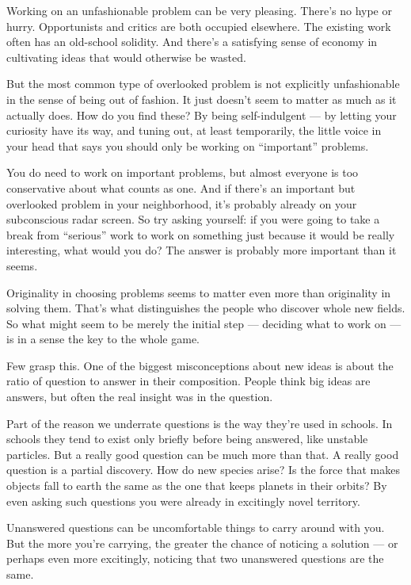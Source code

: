 \documentclass[12pt]{book}
\begin{document}
Working on an unfashionable problem can be very pleasing. There's no
hype or hurry. Opportunists and critics are both occupied elsewhere. The
existing work often has an old-school solidity. And there's a satisfying
sense of economy in cultivating ideas that would otherwise be wasted.

But the most common type of overlooked problem is not explicitly
unfashionable in the sense of being out of fashion. It just doesn't seem
to matter as much as it actually does. How do you find these? By being
self-indulgent --- by letting your curiosity have its way, and tuning
out, at least temporarily, the little voice in your head that says you
should only be working on ``important'' problems.

You do need to work on important problems, but almost everyone is too
conservative about what counts as one. And if there's an important but
overlooked problem in your neighborhood, it's probably already on your
subconscious radar screen. So try asking yourself: if you were going to
take a break from ``serious'' work to work on something just because it
would be really interesting, what would you do? The answer is probably
more important than it seems.

Originality in choosing problems seems to matter even more than
originality in solving them. That's what distinguishes the people who
discover whole new fields. So what might seem to be merely the initial
step --- deciding what to work on --- is in a sense the key to the whole
game.

Few grasp this. One of the biggest misconceptions about new ideas is
about the ratio of question to answer in their composition. People think
big ideas are answers, but often the real insight was in the question.

Part of the reason we underrate questions is the way they're used in
schools. In schools they tend to exist only briefly before being
answered, like unstable particles. But a really good question can be
much more than that. A really good question is a partial discovery. How
do new species arise? Is the force that makes objects fall to earth the
same as the one that keeps planets in their orbits? By even asking such
questions you were already in excitingly novel territory.

Unanswered questions can be uncomfortable things to carry around with
you. But the more you're carrying, the greater the chance of noticing a
solution --- or perhaps even more excitingly, noticing that two
unanswered questions are the same.
\end{document}
